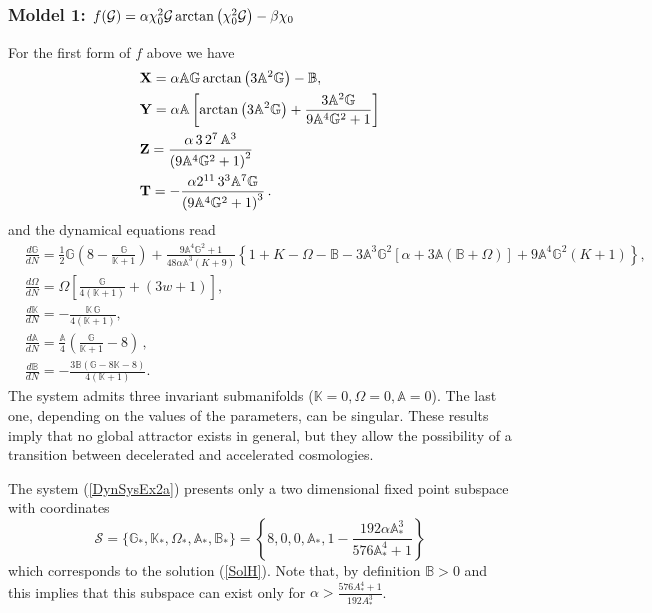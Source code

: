 \documentclass[a4paper,aps,onecolumn,nofootinbib]{revtex4}
\def\rf#1{(\ref{#1})}
\newcommand{\A}{\mathbb{A}}
\def\DerN#1{\frac{d #1}{d N}}
\def\G{{\cal G}}
\begin{document}
\subsubsection{Moldel 1: $f(\G)= \alpha \chi_0^2 \G \arctan\left(\chi_0^2 \G\right)-\beta \chi_0$}
For the first form of $f$ above we have 
 \begin{align} \label{XYT}
& {\bf X}=\alpha  \mathbb{A} \mathbb{G} \arctan\left(3 \mathbb{A}^2
   \mathbb{G}\right)- \mathbb{B},\\
&  {\bf Y}=\alpha  \mathbb{A}
   \left[\arctan\left(3 \mathbb{A}^2 \mathbb{G}\right)+\frac{3 \mathbb{A}^2
   \mathbb{G}}{9 \mathbb{A}^4 \mathbb{G}^2+1}\right]\\
& {\bf Z}=\frac{\alpha\, 3\,  2^7 \, 
   \mathbb{A}^3}{\left(9 \mathbb{A}^4 \mathbb{G}^2+1\right)^2}\\
&  {\bf T}= -\frac{\alpha 2^{11}\, 3^3   \mathbb{A}^7 \mathbb{G}}{\left(9 \mathbb{A}^4
   \mathbb{G}^2+1\right)^3}\,.
\end{align}
and the dynamical equations read
\begin{equation}\label{DynSysEx2a}
\begin{split}
&\DerN{\mathbb{G}}= \frac{1}{2} \mathbb{G}
   \left(8-\frac{\mathbb{G}}{\mathbb{K}+1}\right)+\frac{9 \mathbb{A}^4 \mathbb{G}^2+1}{48 \alpha  \mathbb{A}^3 (K+9)}\left\{1+K-\Omega -\mathbb{B}-3 \mathbb{A}^3 \mathbb{G}^2 \left[\alpha +3 \mathbb{A} (\mathbb{B}+\Omega )\right]+9
   \mathbb{A}^4 \mathbb{G}^2 (K+1)\right\}, \\
&\DerN{\Omega} =\Omega  \left[\frac{\mathbb{G}}{4 (\mathbb{K}+1)}+(3 w+1)\right],\\ 
&\DerN{\mathbb{K} }=-\frac{\mathbb{K}\, \mathbb{G} }{4(
   \mathbb{K}+1)},\\
&\DerN{\mathbb{A}}=\frac{\mathbb{A}}{4}  \left(\frac{\mathbb{G}}{\mathbb{K}+1}-8\right)\,,\\
&\DerN{\mathbb{B}}=-\frac{3 \mathbb{B} (\mathbb{G}-8 \mathbb{K}-8)}{4
   (\mathbb{K}+1)}.
\end{split}
\end{equation}
The system admits three invariant submanifolds ($\mathbb{K}=0, \Omega=0,\mathbb{A}=0$). The last one, depending on the values of the parameters, can be singular. These results imply that no global attractor exists in general, but they allow the possibility of a transition between decelerated and accelerated cosmologies.

The system \rf{DynSysEx2a}  presents only a two dimensional fixed point subspace with coordinates
\begin{equation}
\mathcal{S}=\{\mathbb{G}_*,\mathbb{K}_*,\Omega_*, \A_*, \mathbb{B}_*\}=\left\{8,0,0, \A_*, 1-\frac{192 \alpha  \mathbb{A}_*^3}{576 \mathbb{A}_*^4+1}\right\}
\end{equation}
which corresponds to the solution \rf{SolH}. Note that, by definition $\mathbb{B}>0$ and this implies that this subspace can exist only for $\alpha> \frac{576 A_*^4+1}{192 A_*^3}$.
\end{document}
